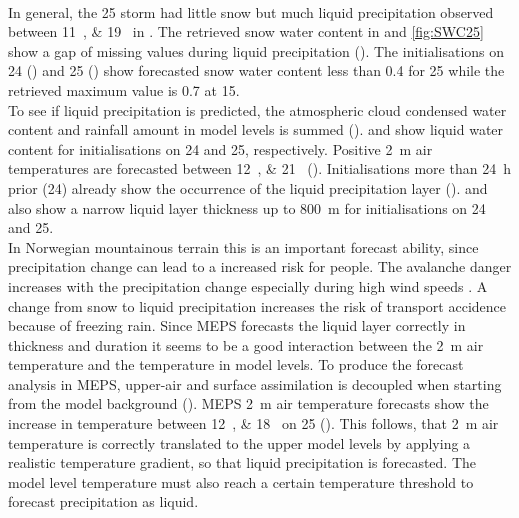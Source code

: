 \\
In general, the \SI{25}{\dec} %
storm had little snow but much %
liquid precipitation observed between \SIlist{11;19}{\UTC} in . The retrieved snow water content in  and \ref{fig:SWC25} show a gap of missing values during liquid precipitation ().
The initialisations on \num{24} () and \SI{25}{\dec} () show forecasted snow water content less than \SI{0.4}{\SWC} for \SI{25}{\dec} while the retrieved maximum value is \SI{0.7}{\SWC} at \SI{15}{\UTC}.
\\
To see if liquid precipitation is predicted, the atmospheric cloud condensed water content and rainfall amount in model levels is summed ().  and  show liquid water content for initialisations on \SI{24}{\dec} and \SI{25}{\dec}, respectively. Positive \SI{2}{\metre} air temperatures are forecasted between \SIlist{12;21}{\UTC} (). Initialisations more than \SI{24}{\hour} prior (\SI{24}{\dec}) already show the occurrence of the liquid precipitation layer ().  and  also show a narrow liquid layer thickness up to \SI{800}{\metre} for initialisations on \num{24} and \SI{25}{\dec}. 
\\
In Norwegian mountainous terrain this is an important forecast ability, since precipitation change can lead to a increased risk for people. The avalanche danger increases with the precipitation change especially during high wind speeds \citep{hansen_warmer_2014}. A change from snow to liquid precipitation increases the risk of transport accidence because of freezing rain.
Since MEPS forecasts the liquid layer correctly in thickness and duration it seems to be a good interaction between the \SI{2}{\metre} air temperature and the temperature in model levels. To produce the forecast analysis in MEPS, upper-air and surface assimilation is decoupled when starting from the model background (). MEPS \SI{2}{\metre} air temperature forecasts show the increase in temperature between \SIlist{12;18}{\UTC} on \SI{25}{\dec} (). This follows, that \SI{2}{\metre} air temperature is correctly translated to the upper model levels by applying a realistic temperature gradient, so that liquid precipitation is forecasted. 
The model level temperature must also reach a certain temperature threshold to forecast precipitation as liquid. 
